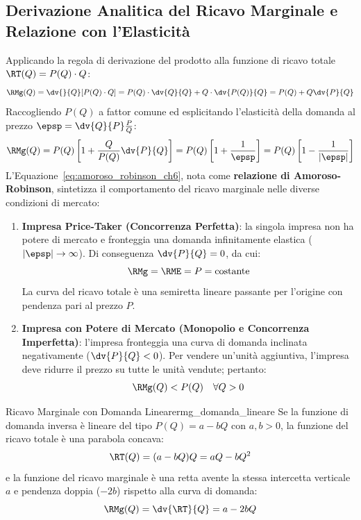 \subsection{Derivazione Analitica del Ricavo Marginale e Relazione con l'Elasticità}
Applicando la regola di derivazione del prodotto alla funzione di ricavo totale $\RT(Q) = P(Q) \cdot Q$:
\begin{equation}
    \RMg(Q) = \dv{}{Q}[P(Q) \cdot Q] = P(Q) \cdot \dv{Q}{Q} + Q \cdot \dv{P(Q)}{Q} = P(Q) + Q \dv{P}{Q}
\end{equation}
Raccogliendo $P(Q)$ a fattor comune ed esplicitando l'elasticità della domanda al prezzo $\epsp = \dv{Q}{P} \frac{P}{Q}$:
\begin{equation}
    \RMg(Q) = P(Q) \left[ 1 + \frac{Q}{P(Q)} \dv{P}{Q} \right] = P(Q) \left[ 1 + \frac{1}{\epsp} \right] = P(Q) \left[ 1 - \frac{1}{|\epsp|} \right]
    \label{eq:amoroso_robinson_ch6}
\end{equation}
L'Equazione~\eqref{eq:amoroso_robinson_ch6}, nota come \textbf{relazione di Amoroso-Robinson}, sintetizza il comportamento del ricavo marginale nelle diverse condizioni di mercato:
\begin{enumerate}
    \item \textbf{Impresa Price-Taker (Concorrenza Perfetta)}: la singola impresa non ha potere di mercato e fronteggia una domanda infinitamente elastica ($|\epsp| \to \infty$). Di conseguenza $\dv{P}{Q} = 0$, da cui:
    \begin{equation}
        \RMg = \RME = P = \text{costante}
    \end{equation}
    La curva del ricavo totale è una semiretta lineare passante per l'origine con pendenza pari al prezzo $P$.
    \item \textbf{Impresa con Potere di Mercato (Monopolio e Concorrenza Imperfetta)}: l'impresa fronteggia una curva di domanda inclinata negativamente ($\dv{P}{Q} < 0$). Per vendere un'unità aggiuntiva, l'impresa deve ridurre il prezzo su tutte le unità vendute; pertanto:
    \begin{equation}
        \RMg(Q) < P(Q) \quad \forall Q > 0
    \end{equation}
\end{enumerate}

\begin{teorema}{Ricavo Marginale con Domanda Lineare}{rmg_domanda_lineare}
Se la funzione di domanda inversa è lineare del tipo $P(Q) = a - bQ$ con $a, b > 0$, la funzione del ricavo totale è una parabola concava:
\begin{equation}
    \RT(Q) = (a - bQ)Q = aQ - bQ^2
\end{equation}
e la funzione del ricavo marginale è una retta avente la stessa intercetta verticale $a$ e pendenza doppia ($-2b$) rispetto alla curva di domanda:
\begin{equation}
    \RMg(Q) = \dv{\RT}{Q} = a - 2bQ
\end{equation}
\end{teorema}


